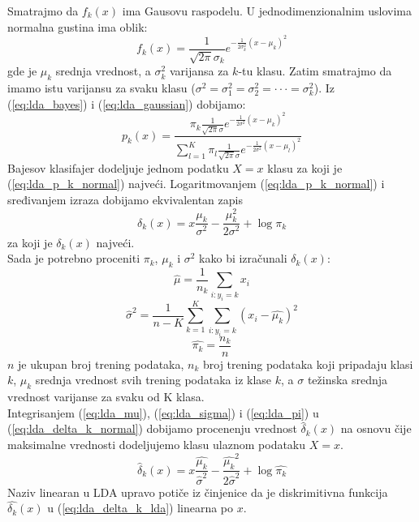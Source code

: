 Smatrajmo da $f_k\left(x\right)$ ima Gausovu raspodelu. U jednodimenzionalnim
uslovima normalna gustina ima oblik:
\begin{equation} \label{eq:lda_gaussian}
  f_k\left(x\right) =
    \frac {1} {\sqrt{2\pi}\sigma_k}
    e^{-\frac{1}{2 \sigma_k^2} (x - \mu_k)^2}
\end{equation}
gde je $\mu_k$ srednja vrednost, a $\sigma_k^2$ varijansa za $k$-tu klasu. Zatim
smatrajmo da imamo istu varijansu za svaku klasu
($\sigma^2 = \sigma_1^2 = \sigma_2^2 = \cdot\cdot\cdot = \sigma_k^2$). Iz
(\ref{eq:lda_bayes}) i (\ref{eq:lda_gaussian}) dobijamo:
\begin{equation} \label{eq:lda_p_k_normal}
  p_k\left(x\right) =
    \frac
    {\pi_k \frac{1}{\sqrt{2\pi}\sigma} e^{-\frac{1}{2 \sigma^2} (x - \mu_k)^2}}
    {\sum_{l=1}^{K} \pi_l \frac{1}{\sqrt{2\pi}\sigma} e^{-\frac{1}{2 \sigma^2} (x - \mu_l)^2}}
\end{equation}
Bajesov klasifajer dodeljuje jednom podatku $X = x$ klasu za koji je
(\ref{eq:lda_p_k_normal}) najveći. Logaritmovanjem (\ref{eq:lda_p_k_normal}) i
sređivanjem izraza dobijamo ekvivalentan zapis
\begin{equation} \label{eq:lda_delta_k_normal}
  \delta_k\left(x\right) =
    x\frac{\mu_k}{\sigma^2} - \frac{\mu_k^2}{2\sigma^2} + \log{\pi_k}
\end{equation}
za koji je $\delta_k\left(x\right)$ najveći. \\

Sada je potrebno proceniti $\pi_k$, $\mu_k$ i $\sigma^2$ kako bi izračunali $\delta_k\left(x\right)$:
\begin{equation} \label{eq:lda_mu} \hat{\mu} = \frac{1}{n_k} \sum_{i:y_i=k} x_i \end{equation}
\begin{equation} \label{eq:lda_sigma} \hat{\sigma}^2 = \frac{1}{n - K} \sum_{k=1}^{K} \sum_{i:y_i=k} (x_i-\hat{\mu_k})^2 \end{equation}
\begin{equation} \label{eq:lda_pi} \hat{\pi_k} = \frac{n_k}{n} \end{equation}
$n$ je ukupan broj trening podataka, $n_k$ broj trening podataka koji
pripadaju klasi $k$, $\mu_k$ srednja vrednost svih trening podataka iz klase $k$,
a $\sigma$ težinska srednja vrednost varijanse za svaku od K klasa. \\

Integrisanjem (\ref{eq:lda_mu}), (\ref{eq:lda_sigma}) i (\ref{eq:lda_pi}) u
(\ref{eq:lda_delta_k_normal}) dobijamo procenenju vrednost $\hat{\delta}_k\left(x\right)$
na osnovu čije maksimalne vrednosti dodeljujemo klasu ulaznom podataku $X = x$.
\begin{equation} \label{eq:lda_delta_k_lda}
  \hat{\delta}_k\left(x\right) =
    x\frac{\hat{\mu_k}}{\hat{\sigma}^2} - \frac{\hat{\mu_k}^2}{2\hat{\sigma}^2} + \log{\hat{\pi_k}}
\end{equation}
Naziv linearan u LDA upravo potiče iz činjenice da je diskrimitivna
funkcija $\hat{\delta_k}\left(x\right)$ u (\ref{eq:lda_delta_k_lda}) linearna po
$x$.

